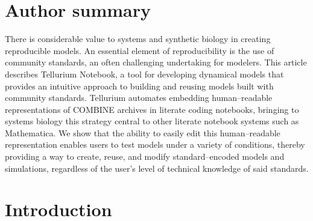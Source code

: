 \documentclass[10pt,letterpaper]{article}
\begin{document}
\section*{Author summary}
There is considerable value to systems and synthetic biology  in creating reproducible models. An essential element of reproducibility  is the use of community standards, an often challenging undertaking for modelers. This article describes Tellurium Notebook, a tool for developing dynamical models that provides an intuitive approach to building and reusing models built with community standards. Tellurium automates embedding human--readable representations of COMBINE archives in literate coding notebooks, bringing to systems biology this strategy central to other literate notebook systems such as Mathematica. We show that the ability to easily edit this human--readable representation enables users to test models under a variety of conditions, thereby providing a way to create, reuse, and modify standard--encoded models and simulations, regardless of the user's level of technical knowledge of said standards.
%
%
%
%

\linenumbers

\section*{Introduction}

\end{document}
